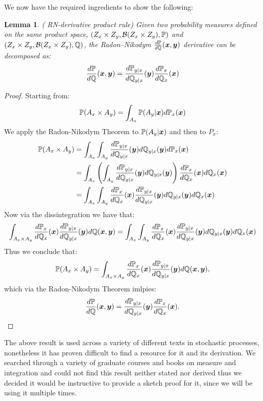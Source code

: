 \documentclass[a4paper,12pt,twoside,openright]{report}
\newtheorem{lemma}[theorem]{Lemma}
\theoremstyle{definition}
\begin{document}
We now have the required ingredients to show the following:
\begin{lemma}\label{lemma:rn_des}( RN-derivative product rule)
Given two probability measures defined on the same product space,  $(Z_x \times Z_y, {\mathcal{B}}(Z_x \times Z_y) ,{\mathbb{P}})$ and $(Z_x \times Z_y, {\mathcal{B}}(Z_x \times Z_y) ,{\mathbb{Q}})$, the Radon–Nikodym $\frac{d{\mathbb{P}}}{d{\mathbb{Q}}} ({\bm{x}},{\bm{y}})$ derivative can be decomposed as:
\begin{align}
    \frac{d{\mathbb{P}}}{d{\mathbb{Q}}} ({\bm{x}},{\bm{y}}) = \frac{d{\mathbb{P}}_{y|x}}{d{\mathbb{Q}}_{y|x}}({\bm{y}})\frac{d{\mathbb{P}}_x}{d{\mathbb{Q}}_x}({\bm{x}})
\end{align}
\end{lemma}
\begin{proof}

Starting from:
\begin{align*}
    {\mathbb{P}}(A_x \times A_y) =  \int_{A_x}{\mathbb{P}}(A_y | {\bm{x}})  d{\mathbb{P}}_{x}({\bm{x}}) 
\end{align*}
We apply the Radon-Nikodym Theorem to ${\mathbb{P}}(A_y | {\bm{x}})$ and then to $P_x$:
\begin{align*}
    {\mathbb{P}}(A_x \times A_y) &=  \int_{A_x}\int_{A_y} \frac{d{\mathbb{P}}_{y|x}}{d{\mathbb{Q}}_{y|x}}({\bm{y}}) d{\mathbb{Q}}_{y|x}({\bm{y}}) d{\mathbb{P}}_{x}({\bm{x}}) \\
     &= \int_{A_x}\left(\int_{A_y} \frac{d{\mathbb{P}}_{y|x}}{d{\mathbb{Q}}_{y|x}}({\bm{y}}) d{\mathbb{Q}}_{y|x}({\bm{y}})\right) \frac{d{\mathbb{P}}_{x}}{d{\mathbb{Q}}_{x}}({\bm{x}})d{\mathbb{Q}}_{x}({\bm{x}}) \\
      &= \int_{A_x}\int_{A_y}\frac{d{\mathbb{P}}_{x}}{d{\mathbb{Q}}_{x}}({\bm{x}})\frac{d{\mathbb{P}}_{y|x}}{d{\mathbb{Q}}_{y|x}}({\bm{y}}) d{\mathbb{Q}}_{y|x}({\bm{y}}) d{\mathbb{Q}}_{x}({\bm{x}})
\end{align*}
Now  via the dissintegration we have that:
\begin{align*}
  \int_{A_x \times A_y} \frac{d{\mathbb{P}}_{x}}{d{\mathbb{Q}}_{x}}({\bm{x}})\frac{d{\mathbb{P}}_{y|x}}{d{\mathbb{Q}}_{y|x}}({\bm{y}}) d{\mathbb{Q}}({\bm{x}},{\bm{y}}) = \int_{A_x}\int_{A_y}\frac{d{\mathbb{P}}_{x}}{d{\mathbb{Q}}_{x}}({\bm{x}})\frac{d{\mathbb{P}}_{y|x}}{d{\mathbb{Q}}_{y|x}}({\bm{y}}) d{\mathbb{Q}}_{y|x}({\bm{y}}) d{\mathbb{Q}}_{x}({\bm{x}})
\end{align*}
Thus we conclude that:
\begin{align*}
    {\mathbb{P}}(A_x \times A_y) = \int_{A_x \times A_y} \frac{d{\mathbb{P}}_{x}}{d{\mathbb{Q}}_{x}}({\bm{x}})\frac{d{\mathbb{P}}_{y|x}}{d{\mathbb{Q}}_{y|x}}({\bm{y}}) d{\mathbb{Q}}({\bm{x}},{\bm{y}}), 
\end{align*}
which via the Radon-Nikodym Theorem imlpies:
\begin{align*}
    \frac{d{\mathbb{P}}}{d{\mathbb{Q}}} ({\bm{x}},{\bm{y}}) = \frac{d{\mathbb{P}}_{y|x}}{d{\mathbb{Q}}_{y|x}}({\bm{y}})\frac{d{\mathbb{P}}_x}{d{\mathbb{Q}}_x}({\bm{x}}).
\end{align*}
\end{proof}
The above result is used across a variety of different texts in stochastic processes, nonetheless it has proven difficult to find a resource for it and its derivation. We searched through a variety of graduate courses and books on measure and integration and could not find this result neither stated nor derived thus we decided it would be instructive to provide a sketch proof for it, since we will be using it multiple times.
\end{document}
